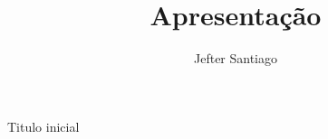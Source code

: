 \documentclass[]{beamer}
\title[Titulo exemplo]{Apresentação}
\author{Jefter Santiago}
\begin{document}
\maketitle


\begin{frame}
{\begin{center} Titulo inicial\end{center}}

\end{frame}
\end{document}
